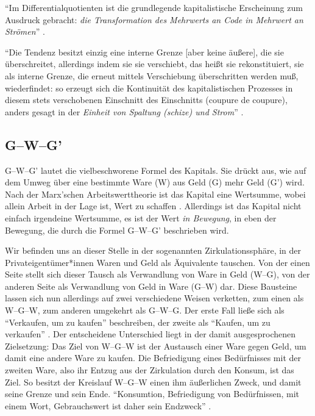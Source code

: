 \documentclass[12pt,
               DIV13,
               paper=a4,
               twoside=false,
               onehalfspacing,
               bibliography=totoc,
               toc=graduated,
               draft,
               ]{scrartcl}
\newcommand{\pc}[2]{\parencite[#1]{#2}}
\newcommand{\vgl}[2]{\parencite[vgl.][#1]{#2}}
\newcommand{\worries}[1]{\ifdraft{\textcolor{blue}{\texttt{(#1)}}}{}}
\newcommand{\gwg}{G--W--G'\xspace}
\newcommand{\wgw}{W--G--W\xspace}
\begin{document}
"`Im Differentialquotienten ist die grundlegende kapitalistische
Erscheinung zum Ausdruck gebracht: \emph{die Transformation des
Mehrwerts an Code in Mehrwert an Strömen}"' \pc{S. 292 f.}{ao}.

"`Die Tendenz besitzt einzig eine interne Grenze [aber keine äußere],
die sie überschreitet, allerdings indem sie sie verschiebt, das heißt
sie rekonstituiert, sie als interne Grenze, die erneut mittels
Verschiebung überschritten \worries{Selbst-Überschreitung} werden muß,
wiederfindet: so erzeugt sich die Kontinuität des kapitalistischen
Prozesses in diesem stets verschobenen Einschnitt des Einschnitts
(coupure de coupure), anders gesagt in der \emph{Einheit von Spaltung
(schize) und Strom}"' \pc{S. 296, meine Hervorh.}{ao}.


\subsection{\gwg}

\gwg lautet die vielbeschworene Formel des Kapitals. Sie drückt aus,
wie auf dem Umweg über eine bestimmte Ware (W) aus Geld (G) mehr Geld
(G') wird. Nach der Marx'schen Arbeitswerttheorie ist das Kapital eine
Wertsumme, wobei allein Arbeit in der Lage ist, Wert zu schaffen
\vgl{181}{kap}. Allerdings ist das Kapital nicht einfach irgendeine
Wertsumme, es ist der Wert \emph{in Bewegung}, in eben der Bewegung,
die durch die Formel \gwg beschrieben wird.



Wir befinden uns an dieser Stelle in der sogenannten
Zirkulationssphäre, in der Privateigentümer*innen Waren und Geld als
Äquivalente tauschen. Von der einen Seite stellt sich dieser Tausch
als Verwandlung von Ware in Geld (W--G), von der anderen Seite als
Verwandlung von Geld in Ware (G--W) dar. Diese Bausteine lassen sich
nun allerdings auf zwei verschiedene Weisen verketten, zum einen als
\wgw, zum anderen umgekehrt als G--W--G. Der erste Fall ließe sich als
"`Verkaufen, um zu kaufen"' beschreiben, der zweite als "`Kaufen, um
zu verkaufen"' \vgl{162}{kap}. Der entscheidene Unterschied liegt in
der damit ausgesprochenen Zielsetzung: Das Ziel von \wgw ist der
Austausch einer Ware gegen Geld, um damit eine andere Ware zu kaufen.
Die Befriedigung eines Bedürfnisses mit der zweiten Ware, also ihr
Entzug aus der Zirkulation durch den Konsum, ist das Ziel. So besitzt
der Kreislauf \wgw einen ihm äußerlichen Zweck, und damit seine Grenze
und sein Ende. "`Konsumtion, Befriedigung von Bedürfnissen, mit einem
Wort, Gebrauchswert ist daher sein Endzweck"' \pc{164}{kap}.
\end{document}
